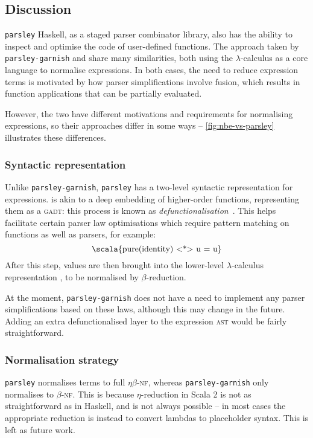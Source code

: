 \documentclass[../../../main.tex]{subfiles}
\begin{document}
\subsection{Discussion}
\texttt{parsley} Haskell, as a staged parser combinator library, also has the ability to inspect and optimise the code of user-defined functions.
The approach taken by \texttt{parsley-garnish} and  share many similarities, both using the $\lambda$-calculus as a core language to normalise expressions.
In both cases, the need to reduce expression terms is motivated by how parser simplifications involve fusion, which results in function applications that can be partially evaluated.

However, the two have different motivations and requirements for normalising expressions, so their approaches differ in some ways --
\cref{fig:nbe-vs-parsley} illustrates these differences.

\subsubsection{Syntactic representation}
Unlike \texttt{parsley-garnish}, \texttt{parsley} has a two-level syntactic representation for expressions.
 is akin to a deep embedding of higher-order functions, representing them as a \textsc{gadt}: this process is known as \emph{defunctionalisation}~\cite{reynolds_defunc_1972,danvy_defunctionalization_2001}.
This helps facilitate certain parser law optimisations which require pattern matching on functions as well as parsers, for example:
\begin{equation*}
\text{\scala{pure(identity) <*> u = u}}
\end{equation*}
After this step,  values are then brought into the lower-level $\lambda$-calculus representation , to be normalised by $\beta$-reduction.

At the moment, \texttt{parsley-garnish} does not have a need to implement any parser simplifications based on these laws, although this may change in the future.
Adding an extra defunctionalised layer to the expression \textsc{ast} would be fairly straightforward.

\subsubsection{Normalisation strategy}
\texttt{parsley} normalises terms to full $\eta\beta$-\textsc{nf}, whereas \texttt{parsley-garnish} only normalises to $\beta$-\textsc{nf}.
This is because $\eta$-reduction in Scala 2 is not as straightforward as in Haskell, and is not always possible -- in most cases the appropriate reduction is instead to convert lambdas to placeholder syntax.
This is left as future work.
\end{document}
